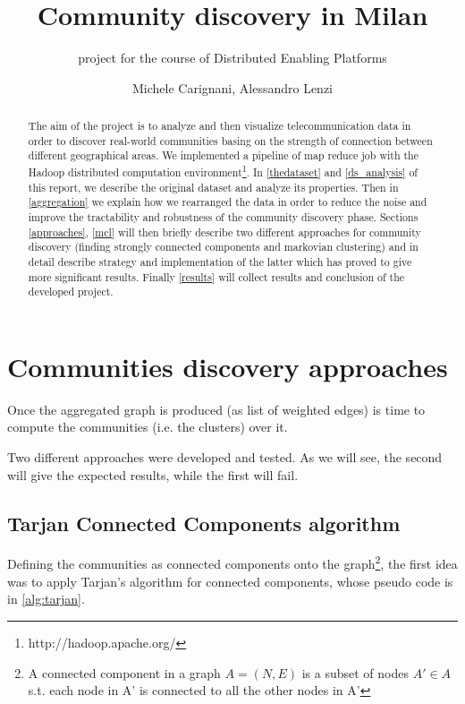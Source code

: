 \documentclass[12pt,a4paper]{article}
\author{Michele Carignani, Alessandro Lenzi}
\title{Community discovery in Milan}
\subtitle{project for the course of Distributed Enabling Platforms}
\begin{document}
\maketitle
\tableofcontents

\begin{abstract}
The aim of the project is to analyze and then visualize telecommunication data
in order to discover real-world communities basing on the strength of connection
between different geographical areas. We implemented a pipeline of
map reduce job with the Hadoop distributed computation
environment\footnote{http://hadoop.apache.org/}.
In \ref{thedataset} and \ref{ds_analysis} of this report, we describe the original dataset
and analyze its properties. Then in \ref{aggregation}
we explain how we rearranged the data in
order to reduce the noise and improve the tractability and robustness of the
community discovery phase. Sections \ref{approaches}, \ref{mcl} will then
briefly describe two different approaches for community discovery
(finding strongly connected components and markovian clustering)
and in detail describe strategy and implementation of the latter which has
proved to give more significant results.
Finally \ref{results} will collect results and conclusion of the developed project.
\end{abstract}








\section{Communities discovery approaches}
\label{approaches}

Once the aggregated graph is produced (as list of weighted edges) is time to compute
the communities (i.e. the clusters) over it.

Two different approaches were developed and tested. 
As we will see, the second will give the
expected results, while the first will fail.

\subsection{Tarjan Connected Components algorithm}
Defining the communities as connected components onto the graph\footnote{A connected component
in a graph $A = (N,E)$ is a subset of nodes $A' \in A$  s.t. each node in A' is connected to 
all the other nodes in A' 
}, the first idea was to apply Tarjan's algorithm for connected components, whose pseudo code is in \ref{alg:tarjan}.
\end{document}
